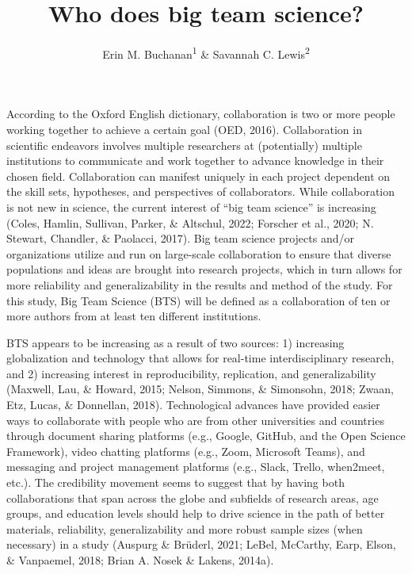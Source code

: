 \documentclass[
  man,floatsintext]{apa6}
\title{Who does big team science?}
\author{Erin M. Buchanan\textsuperscript{1} \& Savannah C. Lewis\textsuperscript{2}}
\date{}
\affiliation{\vspace{0.5cm}\textsuperscript{1} Harrisburg University of Science and Technology\\\textsuperscript{2} University of Alabama}
\begin{document}
\maketitle

According to the Oxford English dictionary, collaboration is two or more
people working together to achieve a certain goal (OED, 2016).
Collaboration in scientific endeavors involves multiple researchers at
(potentially) multiple institutions to communicate and work together to
advance knowledge in their chosen field. Collaboration can manifest
uniquely in each project dependent on the skill sets, hypotheses, and
perspectives of collaborators. While collaboration is not new in
science, the current interest of ``big team science'' is increasing
(Coles, Hamlin, Sullivan, Parker, \& Altschul, 2022; Forscher et al., 2020; N. Stewart, Chandler, \& Paolacci, 2017). Big team science projects
and/or organizations utilize and run on large-scale collaboration to
ensure that diverse populations and ideas are brought into research
projects, which in turn allows for more reliability and generalizability
in the results and method of the study. For this study, Big Team Science
(BTS) will be defined as a collaboration of ten or more authors from at
least ten different institutions.

BTS appears to be increasing as a result of two sources: 1) increasing
globalization and technology that allows for real-time interdisciplinary
research, and 2) increasing interest in reproducibility, replication,
and generalizability (Maxwell, Lau, \& Howard, 2015; Nelson, Simmons, \& Simonsohn, 2018; Zwaan, Etz, Lucas, \& Donnellan, 2018).
Technological advances have provided easier ways to collaborate with
people who are from other universities and countries through document
sharing platforms (e.g., Google, GitHub, and the Open Science
Framework), video chatting platforms (e.g., Zoom, Microsoft Teams), and
messaging and project management platforms (e.g., Slack, Trello,
when2meet, etc.). The credibility movement seems to suggest that by
having both collaborations that span across the globe and subfields of
research areas, age groups, and education levels should help to drive science in the path of better materials, reliability,
generalizability and more robust sample sizes (when necessary) in a study
(Auspurg \& Brüderl, 2021; LeBel, McCarthy, Earp, Elson, \& Vanpaemel, 2018; Brian A. Nosek \& Lakens, 2014a).
\end{document}
